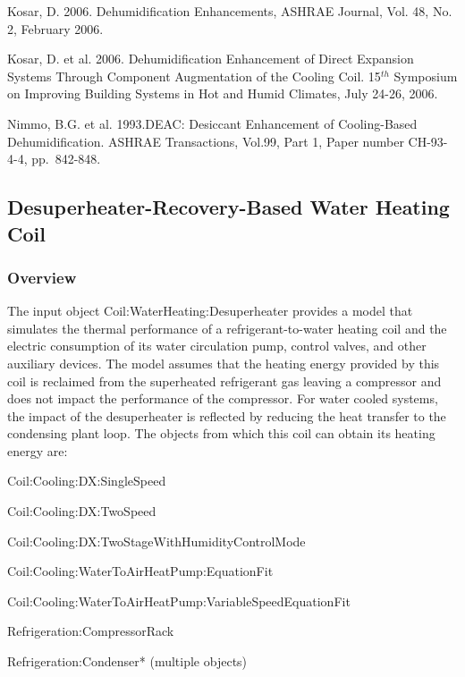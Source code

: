 Kosar, D. 2006. Dehumidification Enhancements, ASHRAE Journal, Vol. 48, No. 2, February 2006.

Kosar, D. et al. 2006. Dehumidification Enhancement of Direct Expansion Systems Through Component Augmentation of the Cooling Coil. 15\(^{th}\) Symposium on Improving Building Systems in Hot and Humid Climates, July 24-26, 2006.

Nimmo, B.G. et al. 1993.DEAC: Desiccant Enhancement of Cooling-Based Dehumidification. ASHRAE Transactions, Vol.99, Part 1, Paper number CH-93-4-4, pp.~842-848.

\subsection{Desuperheater-Recovery-Based Water Heating Coil}\label{desuperheater-recovery-based-water-heating-coil}

\subsubsection{Overview}\label{overview-10}

The input object Coil:WaterHeating:Desuperheater provides a model that simulates the thermal performance of a refrigerant-to-water heating coil and the electric consumption of its water circulation pump, control valves, and other auxiliary devices. The model assumes that the heating energy provided by this coil is reclaimed from the superheated refrigerant gas leaving a compressor and does not impact the performance of the compressor. For water cooled systems, the impact of the desuperheater is reflected by reducing the heat transfer to the condensing plant loop. The objects from which this coil can obtain its heating energy are:

Coil:Cooling:DX:SingleSpeed

Coil:Cooling:DX:TwoSpeed

Coil:Cooling:DX:TwoStageWithHumidityControlMode

Coil:Cooling:WaterToAirHeatPump:EquationFit

Coil:Cooling:WaterToAirHeatPump:VariableSpeedEquationFit

Refrigeration:CompressorRack

Refrigeration:Condenser* (multiple objects)

